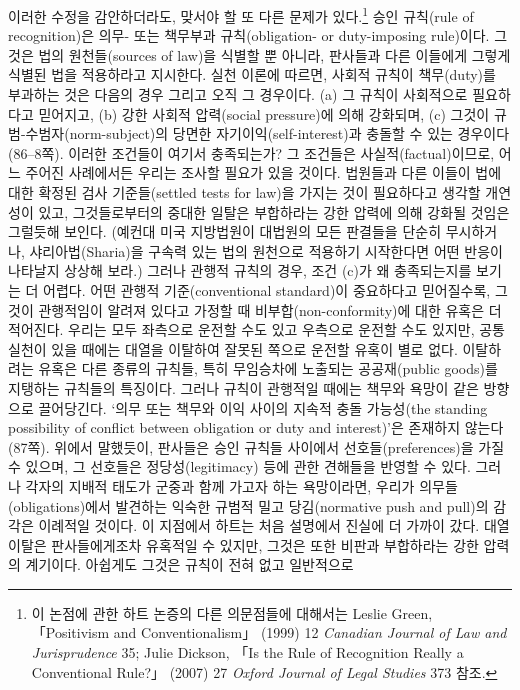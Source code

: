 이러한 수정을 감안하더라도, 맞서야 할 또 다른 문제가 있다.\footnote{이
  논점에 관한 하트 논증의 다른 의문점들에 대해서는 Leslie Green,
  「Positivism and Conventionalism」 (1999) 12 \emph{Canadian Journal of
  Law and Jurisprudence} 35; Julie Dickson, 「Is the Rule of Recognition
  Really a Conventional Rule?」 (2007) 27 \emph{Oxford Journal of Legal
  Studies} 373 참조.} 승인 규칙(rule of recognition)은 의무- 또는
책무부과 규칙(obligation- or duty-imposing rule)이다. 그것은 법의
원천들(sources of law)을 식별할 뿐 아니라, 판사들과 다른 이들에게 그렇게
식별된 법을 적용하라고 지시한다. 실천 이론에 따르면, 사회적 규칙이
책무(duty)를 부과하는 것은 다음의 경우 그리고 오직 그 경우이다. (a) 그
규칙이 사회적으로 필요하다고 믿어지고, (b) 강한 사회적 압력(social
pressure)에 의해 강화되며, (c) 그것이 규범-수범자(norm-subject)의 당면한
자기이익(self-interest)과 충돌할 수 있는 경우이다(86--8쪽). 이러한
조건들이 여기서 충족되는가? 그 조건들은 사실적(factual)이므로, 어느
주어진 사례에서든 우리는 조사할 필요가 있을 것이다. 법원들과 다른 이들이
법에 대한 확정된 검사 기준들(settled tests for law)을 가지는 것이
필요하다고 생각할 개연성이 있고, 그것들로부터의 중대한 일탈은 부합하라는
강한 압력에 의해 강화될 것임은 그럴듯해 보인다. (예컨대 미국 지방법원이
대법원의 모든 판결들을 단순히 무시하거나, 샤리아법(Sharia)을 구속력 있는
법의 원천으로 적용하기 시작한다면 어떤 반응이 나타날지 상상해 보라.)
그러나 관행적 규칙의 경우, 조건 (c)가 왜 충족되는지를 보기는 더 어렵다.
어떤 관행적 기준(conventional standard)이 중요하다고 믿어질수록, 그것이
관행적임이 알려져 있다고 가정할 때 비부합(non-conformity)에 대한 유혹은
더 적어진다. 우리는 모두 좌측으로 운전할 수도 있고 우측으로 운전할 수도
있지만, 공통 실천이 있을 때에는 대열을 이탈하여 잘못된 쪽으로 운전할
유혹이 별로 없다. 이탈하려는 유혹은 다른 종류의 규칙들, 특히 무임승차에
노출되는 공공재(public goods)를 지탱하는 규칙들의 특징이다. 그러나
규칙이 관행적일 때에는 책무와 욕망이 같은 방향으로 끌어당긴다. ‘의무
또는 책무와 이익 사이의 지속적 충돌 가능성(the standing possibility of
conflict between obligation or duty and interest)’은 존재하지
않는다(87쪽). 위에서 말했듯이, 판사들은 승인 규칙들 사이에서
선호들(preferences)을 가질 수 있으며, 그 선호들은 정당성(legitimacy)
등에 관한 견해들을 반영할 수 있다. 그러나 각자의 지배적 태도가 군중과
함께 가고자 하는 욕망이라면, 우리가 의무들(obligations)에서 발견하는
익숙한 규범적 밀고 당김(normative push and pull)의 감각은 이례적일
것이다. 이 지점에서 하트는 처음 설명에서 진실에 더 가까이 갔다. 대열
이탈은 판사들에게조차 유혹적일 수 있지만, 그것은 또한 비판과 부합하라는
강한 압력의 계기이다. 아쉽게도 그것은 규칙이 전혀 없고 일반적으로
